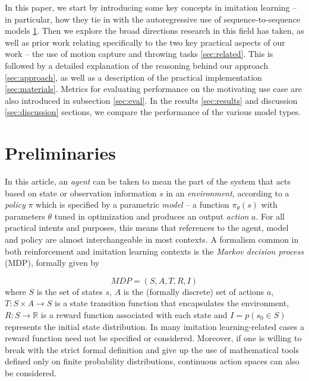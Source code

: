\documentclass{article}
\begin{document}
In this paper, we start by introducing some key concepts in imitation learning -- in particular, how they tie in with the autoregressive use of sequence-to-sequence models \ref{sec:prelim}. Then we explore the broad directions research in this field has taken, as well as prior work relating specifically to the two key practical aspects of our work -- the use of motion capture and throwing tasks \ref{sec:related}. This is followed by a detailed explanation of the reasoning behind our approach \ref{sec:approach}, as well as a description of the practical implementation \ref{sec:materials}. Metrics for evaluating performance on the motivating use case are also introduced in subsection \ref{sec:eval}. In the results \ref{sec:results} and discussion \ref{sec:discussion} sections, we compare the performance of the various model types. 


\section{Preliminaries}
\label{sec:prelim}

In this article, an \emph{agent} can be taken to mean the part of the system that acts based on state or observation information $s$ in an \emph{environment}, according to a \emph{policy} $\pi$ which is specified by a parametric \emph{model} -- a function $\pi_{\theta}(s)$ with parameters $\theta$ tuned in optimization and produces an output \emph{action} $a$. For all practical intents and purposes, this means that references to the agent, model and policy are almost interchangeable in most contexts. A formalism common in both reinforcement and imitation learning contexts is the \emph{Markov decision process} (MDP), formally given by \citep{attia2018global}

\begin{equation}
	MDP = (S,A,T,R,I)
\end{equation}
where $S$ is the set of states $s$, $A$ is the (formally discrete) set of actions $a$, $T:S \times A \rightarrow S$ is a state transition function that encapsulates the environment, $R:S \rightarrow \mathbb{R}$ is a reward function associated with each state and $I = p\left(s_0 \in S\right)$ represents the initial state distribution. In many imitation learning-related cases a reward function need not be specified or considered. Moreover, if one is willing to break with the strict formal definition and give up the use of mathematical tools defined only on finite probability distributions, continuous action spaces can also be considered.
\end{document}
